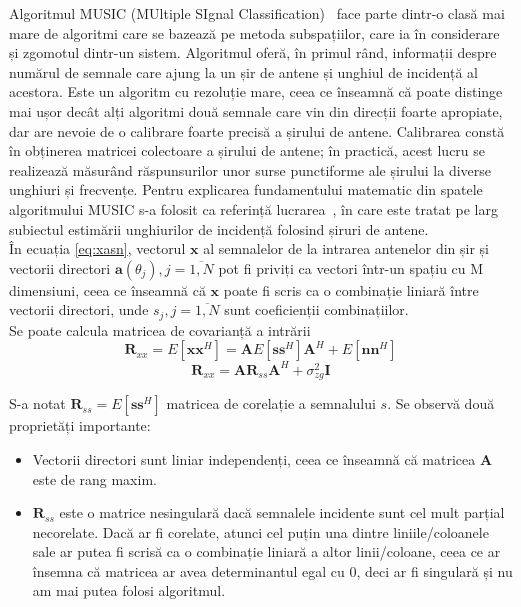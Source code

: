 Algoritmul MUSIC (MUltiple SIgnal Classification)~\cite{music-schmidt} face
parte dintr-o clasă mai mare de algoritmi care se bazează pe metoda
subspațiilor, care ia în considerare și zgomotul dintr-un sistem. Algoritmul
oferă, în primul rând, informații despre numărul de semnale care ajung la un
șir de antene și unghiul de incidență al acestora. Este un algoritm cu
rezoluție mare, ceea ce înseamnă că poate distinge mai ușor decât alți
algoritmi două semnale care vin din direcții foarte apropiate, dar are nevoie
de o calibrare foarte precisă a șirului de antene.  Calibrarea constă în
obținerea matricei colectoare a șirului de antene; în practică, acest lucru se
realizează măsurând răspunsurilor unor surse punctiforme ale șirului la diverse
unghiuri și frecvențe. Pentru explicarea fundamentului matematic din spatele
algoritmului MUSIC s-a folosit ca referință lucrarea~\cite{doa-1996}, în care
este tratat pe larg subiectul estimării unghiurilor de incidență folosind
șiruri de antene.\\

În ecuația \eqref{eq:xasn}, vectorul $\bm{x}$ al semnalelor de la intrarea
antenelor din șir și vectorii directori $\bm{a}(\theta_j), j = \overline{1, N}$
pot fi priviți ca vectori într-un spațiu cu M dimensiuni, ceea ce înseamnă că
$\bm{x}$ poate fi scris ca o combinație liniară între vectorii directori, unde $s_j,
j = \overline{1, N}$ sunt coeficienții combinațiilor. \\

Se poate calcula matricea de covarianță a intrării
\begin{equation}
    \bm{R}_{xx} = E[\bm{xx}^H] = \bm{A}E[\bm{ss}^H]\bm{A}^H + E[\bm{nn}^H]
\end{equation}
\begin{equation}
    \bm{R}_{xx} = \bm{A}\bm{R}_{ss}\bm{A}^H + \sigma^2_{zg}\bm{I}
\end{equation}

S-a notat $\bm{R}_{ss} = E[\bm{ss}^H]$ matricea de corelație a semnalului $s$.
Se observă două proprietăți importante:
\begin{itemize}
    \item Vectorii directori sunt liniar independenți, ceea ce înseamnă că
    matricea $\bm{A}$ este de rang maxim.
    \item $\bm{R}_{ss}$ este o matrice nesingulară dacă semnalele incidente sunt
    cel mult parțial necorelate. Dacă ar fi corelate, atunci cel puțin una
    dintre liniile/coloanele sale ar putea fi scrisă ca o combinație liniară a
    altor linii/coloane, ceea ce ar însemna că matricea ar avea determinantul
    egal cu 0, deci ar fi singulară și nu am mai putea folosi algoritmul.
\end{itemize}

